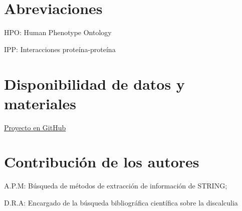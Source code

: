 \documentclass{bmcart}
\begin{document}
	\begin{backmatter}
	
		\section*{Abreviaciones}%
			HPO: Human Phenotype Ontology
			\hfill
			
			IPP: Interacciones proteína-proteína

		
		\section*{Disponibilidad de datos y materiales}%
			\href{https://github.com/Archerd6/Projecto_Biologia_de_Sistemas}{Proyecto en GitHub}
		
		\section*{Contribución de los autores}
			
			A.P.M:  Búsqueda de métodos de extracción de información de STRING;
			\hfill
			
			D.R.A: Encargado de la búsqueda bibliográfica científica sobre la discalculia
		
		
		
	
	\end{backmatter}
\end{document}
